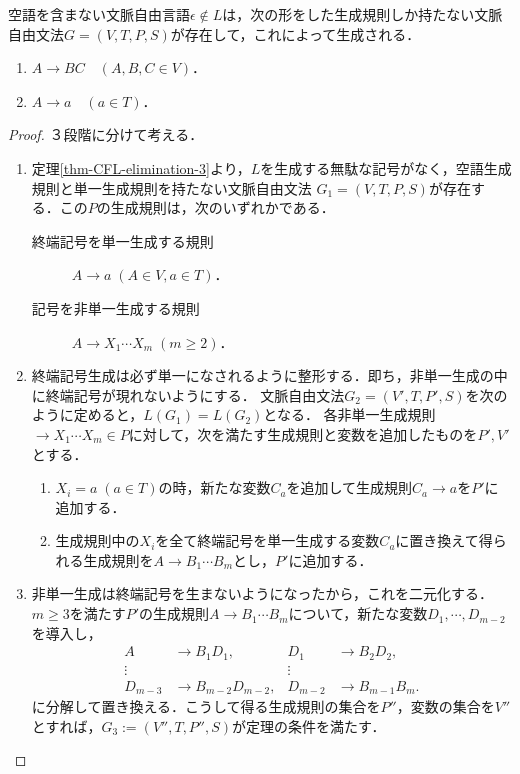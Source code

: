 \documentclass[uplatex, dvipdfmx]{jsreport}
\begin{document}
\begin{theorem}\label{thm-Chomsky-normal-form}
    空語を含まない文脈自由言語$\epsilon\notin L$は，次の形をした生成規則しか持たない文脈自由文法$G=(V,T,P,S)$が存在して，これによって生成される．
    \begin{enumerate}
        \item $A\to BC\quad(A,B,C\in V)$．
        \item $A\to a\quad(a\in T)$．
    \end{enumerate}
\end{theorem}
\begin{proof}３段階に分けて考える．
    \begin{enumerate}
        \item 定理\ref{thm-CFL-elimination-3}より，$L$を生成する無駄な記号がなく，空語生成規則と単一生成規則を持たない文脈自由文法
        $G_1=(V,T,P,S)$が存在する．この$P$の生成規則は，次のいずれかである．
        \begin{description}
            \item[終端記号を単一生成する規則] $A\to a\;(A\in V,a\in T)$．
            \item[記号を非単一生成する規則] $A\to X_1\cdots X_m\;(m\ge 2)$．
        \end{description}
        \item 終端記号生成は必ず単一になされるように整形する．即ち，非単一生成の中に終端記号が現れないようにする．
        文脈自由文法$G_2=(V',T,P',S)$を次のように定めると，$L(G_1)=L(G_2)$となる．
        各非単一生成規則$\to X_1\cdots X_m\in P$に対して，次を満たす生成規則と変数を追加したものを$P',V'$とする．
        \begin{enumerate}[(1)]
            \item $X_i=a\;(a\in T)$の時，新たな変数$C_a$を追加して生成規則$C_a\to a$を$P'$に追加する．
            \item 生成規則中の$X_i$を全て終端記号を単一生成する変数$C_a$に置き換えて得られる生成規則を$A\to B_1\cdots B_m$とし，$P'$に追加する．
        \end{enumerate}
        \item 非単一生成は終端記号を生まないようになったから，これを二元化する．$m\ge 3$を満たす$P'$の生成規則$A\to B_1\cdots B_m$について，新たな変数$D_1,\cdots,D_{m-2}$を導入し，
        \begin{align*}
            A&\to B_1D_1,&D_1&\to B_2D_2,\\
            \vdots&&\vdots\\
            D_{m-3}&\to B_{m-2}D_{m-2},&D_{m-2}&\to B_{m-1}B_m.
        \end{align*}
        に分解して置き換える．こうして得る生成規則の集合を$P''$，変数の集合を$V''$とすれば，$G_3:=(V'',T,P'',S)$が定理の条件を満たす．
    \end{enumerate}
\end{proof}
\end{document}
